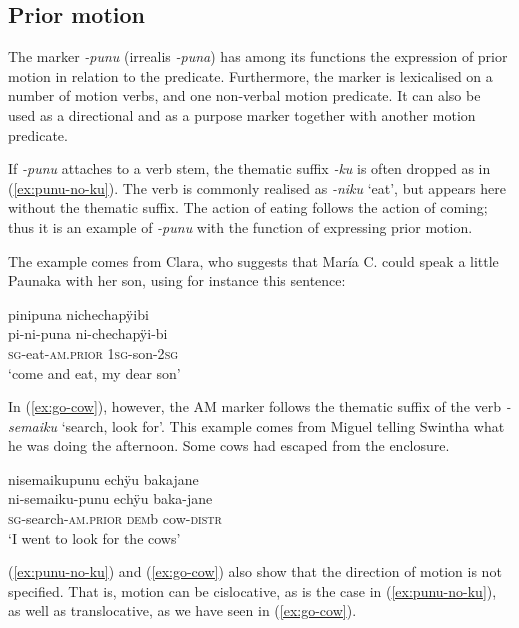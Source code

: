 \subsection{Prior motion}\label{sec:punu}

The marker \textit{-punu} (irrealis \textit{-puna}) has among its functions the expression of prior motion in relation to the predicate. Furthermore, the marker is lexicalised on a number of motion verbs, and one non-verbal motion predicate. It can also be used as a directional and as a purpose marker together with another motion predicate.

If \textit{-punu} attaches to a verb stem, the thematic suffix  \textit{-ku} is often dropped as in (\ref{ex:punu-no-ku}). The verb is commonly realised as \textit{-niku} ‘eat’, but appears here without the thematic suffix. The action of eating follows the action of coming; thus it is an example of \textit{-punu} with the function of expressing prior motion.

The example comes from Clara, who suggests that María C. could speak a little Paunaka with her son, using for instance this sentence: 

\ea\label{ex:punu-no-ku}
\begingl 
\glpreamble pinipuna nichechapÿibi\\
\gla pi-ni-puna ni-chechapÿi-bi\\ 
\textsc{sg}-eat-\textsc{am.prior} 1\textsc{sg}-son-2\textsc{sg}\\ 
\glft ‘come and eat, my dear son’
\trailingcitation{[cux-c120414ls-2.302]}
\xe

In (\ref{ex:go-cow}), however, the AM marker follows the thematic suffix of the verb \textit{-semaiku} ‘search, look for’. This example comes from Miguel telling Swintha what he was doing the afternoon. Some cows had escaped from the enclosure.

\ea\label{ex:go-cow}
\begingl
\glpreamble nisemaikupunu echÿu bakajane\\
\gla ni-semaiku-punu echÿu baka-jane\\
\textsc{sg}-search-\textsc{am.prior} \textsc{dem}b cow-\textsc{distr}\\
\glft ‘I went to look for the cows’
\endgl
\trailingcitation{[mxx-n101017s-2.072]}
\xe{}


(\ref{ex:punu-no-ku}) and (\ref{ex:go-cow}) also show that the direction of motion is not specified. That is, motion can be cislocative, as is the case in (\ref{ex:punu-no-ku}), as well as translocative, as we have seen in (\ref{ex:go-cow}).

